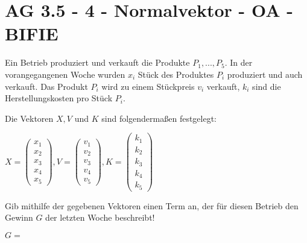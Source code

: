 \section{AG 3.5 - 4 - Normalvektor - OA - BIFIE}

\begin{beispiel}[AG 3.5]{1} %
Ein Betrieb produziert und verkauft die Produkte $P_{1}, ..., P_{5}$. In der vorangegangenen Woche wurden $x_{i}$ Stück des Produktes $P_{i}$ produziert und auch verkauft. Das Produkt $P_{i}$ wird zu einem Stückpreis $v_{i}$ verkauft, $k_{i}$ sind die Herstellungskosten pro Stück $P_{i}$.

Die Vektoren $X,V$ und $K$ sind folgendermaßen festgelegt:
\leer

\begin{center}
$X=\left(\begin{array}{r}x_1\\x_2\\x_3\\x_4\\x_5\end{array}\right), V=\left(\begin{array}{r}v_1\\v_2\\v_3\\v_4\\v_5\end{array}\right), K=\left(\begin{array}{r}k_1\\k_2\\k_3\\k_4\\k_5\end{array}\right)$
\end{center}

Gib mithilfe der gegebenen Vektoren einen Term an, der für diesen Betrieb den Gewinn $G$ der letzten Woche beschreibt!
\leer

$G=$ 
\end{beispiel}
